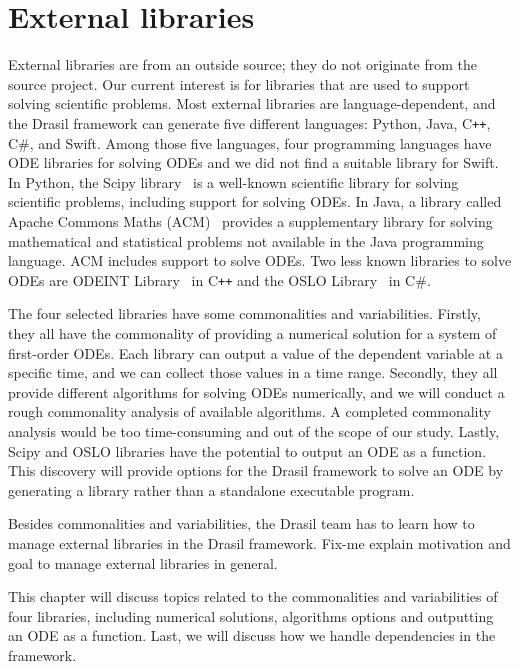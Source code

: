 \chapter{External libraries}
External libraries are from an outside source; they do not originate from the source project. Our current interest is for libraries that are used to support solving scientific problems. Most external libraries are language-dependent, and the Drasil framework can generate five different languages: Python, Java, C\texttt{++}, C\#, and Swift. Among those five languages, four programming languages have ODE libraries for solving ODEs and we did not find a suitable library for Swift. In Python, the Scipy library~\citep{scipy} is a well-known scientific library for solving scientific problems, including support for solving ODEs. In Java, a library called Apache Commons Maths (ACM)~\citep{apache} provides a supplementary library for solving mathematical and statistical problems not available in the Java programming language. ACM includes support to solve ODEs. Two less known libraries to solve ODEs are ODEINT Library~\citep{odeint} in C\texttt{++} and the OSLO Library~\citep{oslo} in C\#.

The four selected libraries have some commonalities and variabilities. Firstly, they all have the commonality of providing a numerical solution for a system of first-order ODEs. Each library can output a value of the dependent variable at a specific time, and we can collect those values in a time range. Secondly, they all provide different algorithms for solving ODEs numerically, and we will conduct a rough commonality analysis of available algorithms. A completed commonality analysis would be too time-consuming and out of the scope of our study. Lastly, Scipy and OSLO libraries have the potential to output an ODE as a function. This discovery will provide options for the Drasil framework to solve an ODE by generating a library rather than a standalone executable program. 

Besides commonalities and variabilities, the Drasil team has to learn how to manage external libraries in the Drasil framework. 
Fix-me explain motivation and goal to manage external libraries in general.

This chapter will discuss topics related to the commonalities and variabilities of four libraries, including numerical solutions, algorithms options and outputting an ODE as a function. Last, we will discuss how we handle dependencies in the framework.

